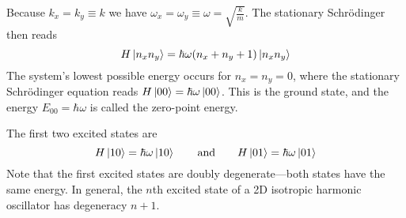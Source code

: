 \documentclass[11pt, a4paper]{article}
\newcommand{\eqtext}[1]{\qquad \text{#1} \qquad}
\newcommand{\schro}{Schr\"{o}dinger\xspace}
\begin{document}
\begin{itemize}
	Because $ k_{x} = k_{y} \equiv k $ we have $ \omega_{x} = \omega_{y} \equiv \omega = \sqrt{\frac{k}{m}}$. The stationary \schro then reads
	\begin{equation*}
		H\ket{n_{x}n_{y}} = \hbar \omega (n_{x} + n_{y} + 1)\ket{n_{x}n_{y}}
	\end{equation*}
	The system's lowest possible energy occurs for $ n_{x} = n_{y} = 0 $, where the stationary \schro equation reads $ H\ket{00} = \hbar \omega \ket{00} $. This is the ground state, and the energy $ E_{00} = \hbar \omega $ is called the zero-point energy. 
	
	The first two excited states are
	\begin{equation*}
		H\ket{10} = \hbar \omega \ket{10} \eqtext{and} H\ket{01} = \hbar \omega \ket{01}
	\end{equation*}
	Note that the first excited states are doubly degenerate---both states have the same energy. In general, the $ n $th excited state of a 2D isotropic harmonic oscillator has degeneracy $ n +1 $. 
\end{itemize}
\end{document}
